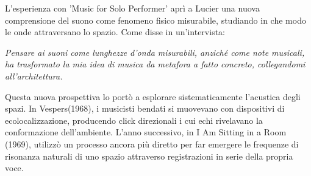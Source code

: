 L'esperienza con 'Music for Solo Performer' aprì a Lucier una nuova comprensione del suono come fenomeno fisico misurabile, studiando in che modo le onde attraversano lo spazio. Come disse in un'intervista:

\textit{Pensare ai suoni come lunghezze d'onda misurabili, anziché come note musicali, ha trasformato la mia idea di musica da metafora a fatto concreto, collegandomi all'architettura.}

Questa nuova prospettiva lo portò a esplorare sistematicamente l'acustica degli spazi. In Vespers(1968), i musicisti bendati si muovevano con dispositivi di ecolocalizzazione, producendo click direzionali i cui echi rivelavano la conformazione dell'ambiente. L'anno successivo, in I Am Sitting in a Room (1969), utilizzò un processo ancora più diretto per far emergere le frequenze di risonanza naturali di uno spazio attraverso registrazioni in serie della propria voce.